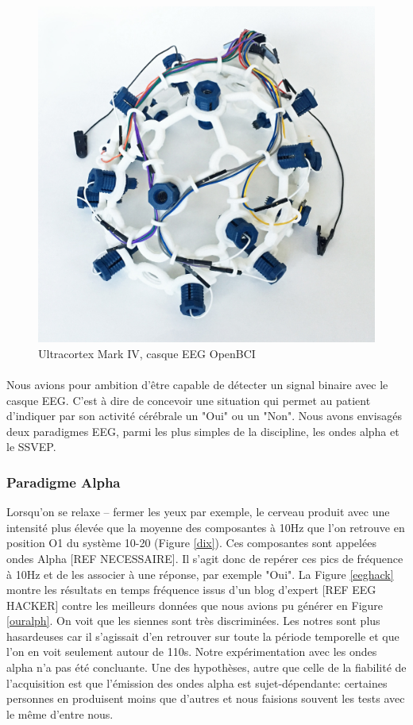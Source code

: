 \documentclass[11pt,a4paper]{article}
\theoremstyle{plain}
\theoremstyle{definition}
\begin{document}
\begin{figure}[h!]
\centering
\includegraphics[scale=0.05]{OpenBCI.jpg}
\caption{Ultracortex Mark IV, casque EEG OpenBCI}
\label{openbci}
\end{figure}

\paragraph{}Nous avions pour ambition d'être capable de détecter un signal binaire avec le casque EEG. C'est à dire de concevoir une situation qui permet au patient
d'indiquer par son activité cérébrale un "Oui" ou un "Non". Nous avons envisagés deux paradigmes EEG, parmi les plus simples de la discipline, les ondes alpha et 
le SSVEP. 

\subsubsection{Paradigme Alpha}

Lorsqu'on se relaxe -- fermer les yeux par exemple, le cerveau produit avec une intensité plus élevée que la moyenne des composantes à 10Hz que l'on retrouve en position O1 du système 10-20 (Figure \ref{dix}).
Ces composantes sont appelées ondes Alpha [REF NECESSAIRE]. Il s'agit donc de repérer ces pics de fréquence à 10Hz et de les associer à une réponse, par
exemple "Oui". La Figure \ref{eeghack} montre les résultats en temps fréquence issus d'un blog d'expert [REF EEG HACKER] contre les meilleurs données que nous avions pu générer en Figure \ref{ouralph}.
On voit que les siennes sont très discriminées. Les notres sont plus hasardeuses car il s'agissait d'en retrouver sur toute la période temporelle et que l'on en voit seulement autour de 110s. Notre expérimentation avec les ondes alpha n'a pas été concluante. Une des hypothèses,
autre que celle de la fiabilité de l'acquisition est que l'émission des ondes alpha est sujet-dépendante: certaines personnes en produisent moins que d'autres et nous faisions souvent
les tests avec le même d'entre nous.
\end{document}
